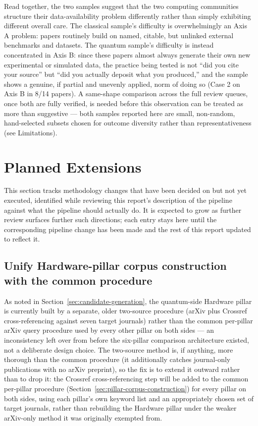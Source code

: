 \documentclass[11pt]{article}
\begin{document}
Read together, the two samples suggest that the two computing communities structure
their data-availability problem differently rather than simply exhibiting different
overall care. The classical sample's difficulty is overwhelmingly an Axis A problem:
papers routinely build on named, citable, but unlinked external benchmarks and
datasets. The quantum sample's difficulty is instead concentrated in Axis B: since these
papers almost always generate their own new experimental or simulated data, the
practice being tested is not ``did you cite your source'' but ``did you actually deposit
what you produced,'' and the sample shows a genuine, if partial and unevenly applied,
norm of doing so (Case 2 on Axis B in 8/14 papers). A same-shape comparison across the
full review queues, once both are fully verified, is needed before this observation can
be treated as more than suggestive --- both samples reported here are small,
non-random, hand-selected subsets chosen for outcome diversity rather than
representativeness (see Limitations).

\section{Planned Extensions}
\label{sec:planned-extensions}

This section tracks methodology changes that have been decided on but not yet
executed, identified while reviewing this report's description of the pipeline against
what the pipeline should actually do. It is expected to grow as further review surfaces
further such directions; each entry stays here until the corresponding pipeline change
has been made and the rest of this report updated to reflect it.

\subsection{Unify Hardware-pillar corpus construction with the common procedure}
\label{sec:planned-hardware-unification}

As noted in Section~\ref{sec:candidate-generation}, the quantum-side Hardware pillar is
currently built by a separate, older two-source procedure (arXiv plus Crossref
cross-referencing against seven target journals) rather than the common per-pillar
arXiv query procedure used by every other pillar on both sides --- an inconsistency
left over from before the six-pillar comparison architecture existed, not a deliberate
design choice. The two-source method is, if anything, more thorough than the common
procedure (it additionally catches journal-only publications with no arXiv preprint),
so the fix is to extend it outward rather than to drop it: the Crossref
cross-referencing step will be added to the common per-pillar procedure
(Section~\ref{sec:pillar-corpus-construction}) for every pillar on both sides, using
each pillar's own keyword list and an appropriately chosen set of target journals,
rather than rebuilding the Hardware pillar under the weaker arXiv-only method it was
originally exempted from.
\end{document}
